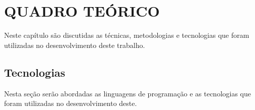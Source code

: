 \chapter{QUADRO TEÓRICO}

\par Neste capítulo são discutidas as técnicas, metodologias e tecnologias que foram utilizadas no desenvolvimento deste trabalho.






\section{Tecnologias}

\par Nesta seção serão abordadas as linguagens de programação e as tecnologias que foram utilizadas no desenvolvimento deste.



%





















